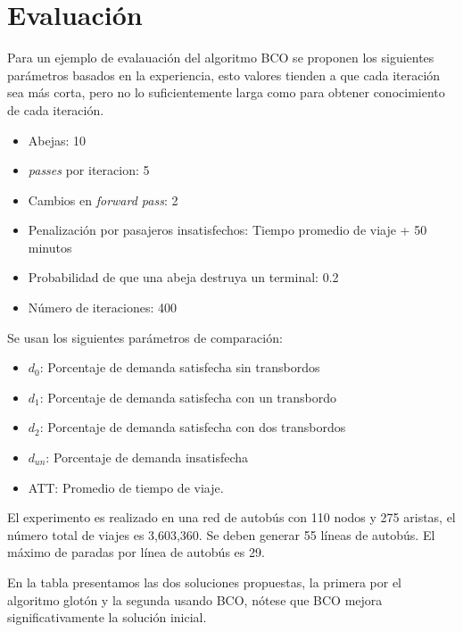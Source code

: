 \documentclass[letterpaper,12pt]{article}
\begin{document}
\section{Evaluación}

Para un ejemplo de evalauación del algoritmo BCO se proponen los siguientes 
parámetros basados en la experiencia, esto valores tienden a que cada 
iteración sea más corta, pero no lo suficientemente larga como para obtener 
conocimiento de cada iteración.

\begin{itemize}
    \itemsep0em 
    \item Abejas: 10
    \item \textit{passes} por iteracion: 5
    \item Cambios en \textit{forward pass}: 2
    \item Penalización por pasajeros insatisfechos: 
    Tiempo promedio de viaje + 50 minutos
    \item Probabilidad de que una abeja destruya un terminal: 0.2
    \item Número de iteraciones: 400
\end{itemize}

Se usan los siguientes parámetros de comparación:

\begin{itemize}
    \itemsep0em 
    \item $d_0$: Porcentaje de demanda satisfecha sin transbordos
    \item $d_1$: Porcentaje de demanda satisfecha con un transbordo
    \item $d_2$: Porcentaje de demanda satisfecha con dos transbordos
    \item $d_{un}$: Porcentaje de demanda insatisfecha
    \item ATT: Promedio de tiempo de viaje.
\end{itemize}

El experimento es realizado en una red de autobús con 110 nodos y 275 aristas, 
el número total de viajes es 3,603,360. Se deben generar 55 líneas de autobús. 
El máximo de paradas por línea de autobús es 29.

En la tabla presentamos las dos soluciones propuestas, la primera por el 
algoritmo glotón y la segunda usando BCO, nótese que BCO mejora 
significativamente la solución inicial.
\end{document}
